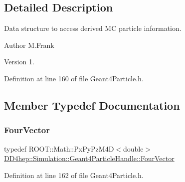 \subsection{Detailed Description}
Data structure to access derived MC particle information. 

\begin{DoxyAuthor}{Author}
M.\+Frank 
\end{DoxyAuthor}
\begin{DoxyVersion}{Version}
1. 
\end{DoxyVersion}


Definition at line 160 of file Geant4\+Particle.\+h.



\subsection{Member Typedef Documentation}
\hypertarget{class_d_d4hep_1_1_simulation_1_1_geant4_particle_handle_a79648f819b70d2f741fd1a5e19dc2f23}{}\label{class_d_d4hep_1_1_simulation_1_1_geant4_particle_handle_a79648f819b70d2f741fd1a5e19dc2f23} 
\subsubsection{\texorpdfstring{Four\+Vector}{FourVector}}
{\footnotesize\ttfamily typedef R\+O\+O\+T\+::\+Math\+::\+Px\+Py\+Pz\+M4D$<$double$>$ \hyperlink{class_d_d4hep_1_1_simulation_1_1_geant4_particle_handle_a79648f819b70d2f741fd1a5e19dc2f23}{D\+D4hep\+::\+Simulation\+::\+Geant4\+Particle\+Handle\+::\+Four\+Vector}}



Definition at line 162 of file Geant4\+Particle.\+h.

\hypertarget{class_d_d4hep_1_1_simulation_1_1_geant4_particle_handle_a8aabe9ad3397b25aae653c42ec82021a}{}\label{class_d_d4hep_1_1_simulation_1_1_geant4_particle_handle_a8aabe9ad3397b25aae653c42ec82021a} 
